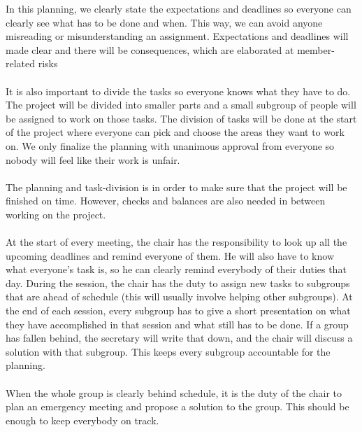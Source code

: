 In this planning, we clearly state the expectations and deadlines so everyone can clearly see what has to be done and when. This way, we can avoid anyone misreading or misunderstanding an assignment.
Expectations and deadlines will made clear and there will be consequences, which are elaborated at member-related risks
\\\\

It is also important to divide the tasks so everyone knows what they have to do. The project will be divided into smaller parts and a small subgroup of people will be assigned to work on those tasks. The division of tasks will be done at the start of the project where everyone can pick and choose the areas they want to work on. We only finalize the planning with unanimous approval from everyone so nobody will feel like their work is unfair.\\\\

The planning and task-division is in order to make sure that the project will be finished on time. However, checks and balances are also needed in between working on the project.\\\\

At the start of every meeting, the chair has the responsibility to look up all the upcoming deadlines and remind everyone of them. He will also have to know what everyone's task is, so he can clearly remind everybody of their duties that day. During the session, the chair  has the duty to assign new tasks to subgroups that are ahead of schedule (this will usually involve helping other subgroups). At the end of each session, every subgroup has to give a short presentation on what they have accomplished in that session and what still has to be done. If a group has fallen behind, the secretary will write that down, and the chair will discuss a solution with that subgroup. This keeps every subgroup accountable for the planning. \\\\
When the whole group is clearly behind schedule, it is the duty of the chair to plan an emergency meeting and propose a solution to the group. This should be enough to keep everybody on track.\\

